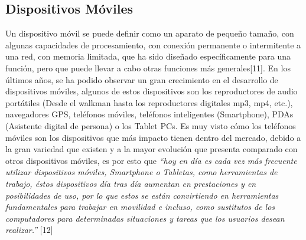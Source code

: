 \documentclass[12pt,letterpaper,openany]{book}
\begin{document}
\subsection{Dispositivos Móviles}
Un dispositivo móvil se puede definir como un aparato de pequeño tamaño, con algunas capacidades de procesamiento, con conexión permanente o intermitente a una red, con memoria limitada, que ha sido diseñado específicamente para una función, pero que puede llevar a cabo otras funciones más generales[11].
\vspace{5mm}\newline
En los últimos años, se ha podido observar un gran crecimiento en el desarrollo de dispositivos móviles, algunos de estos dispositivos son los reproductores de audio portátiles (Desde el walkman hasta los reproductores digitales mp3, mp4, etc.), navegadores GPS, teléfonos móviles, teléfonos inteligentes (Smartphone), PDAs (Asistente digital de persona) o los Tablet PCs.
\vspace{5mm}\newline
Es muy visto cómo los teléfonos móviles son los dispositivos que más impacto tienen dentro del mercado, debido a la gran variedad que existen y a la mayor evolución que presenta comparado con otros dispositivos móviles, es por esto que \textit{“hoy en día es cada vez más frecuente utilizar dispositivos móviles, Smartphone o Tabletas, como herramientas de trabajo, éstos dispositivos día tras día aumentan en prestaciones y en posibilidades de uso, por lo que estos se están convirtiendo en herramientas fundamentales para trabajar en movilidad e incluso, como sustitutos de los computadores para determinadas situaciones y tareas que los usuarios desean realizar.”} [12] 
\end{document}
